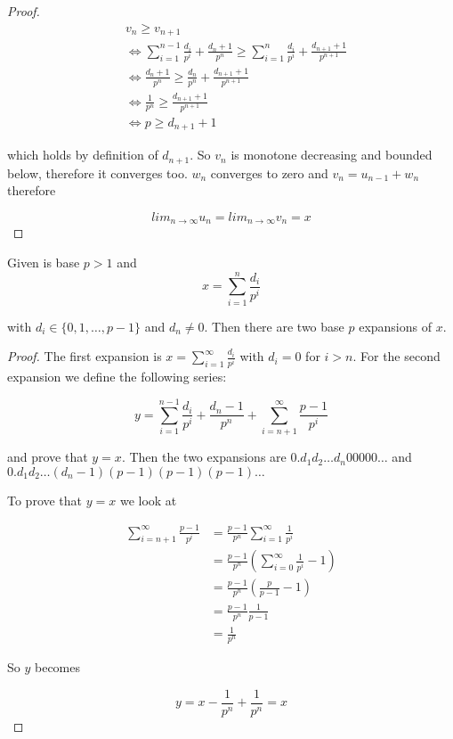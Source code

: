 \begin{proof}
\begin{align*}
& v_n \geq v_{n+1} \\
&\Leftrightarrow \sum_{i = 1}^{n-1} \frac{d_i}{p^i} + \frac{d_n + 1}{p^n} \geq \sum_{i = 1}^n \frac{d_i}{p^i} + \frac{d_{n+1} + 1}{p^{n+1}} \\
&\Leftrightarrow \frac{d_n + 1}{p^n} \geq \frac{d_n}{p^n} + \frac{d_{n+1} + 1}{p^{n+1}} \\
&\Leftrightarrow \frac{1}{p^n} \geq \frac{d_{n+1} + 1}{p^{n+1}} \\
&\Leftrightarrow p \geq d_{n+1} + 1
\end{align*}

which holds by definition of $d_{n+1}$. So $v_n$ is monotone decreasing and bounded below, therefore it converges too. $w_n$ converges to zero and $v_n = u_{n-1} + w_n$ therefore 

$$
lim_{n \to \infty} u_n = lim_{n \to \infty} v_n = x
$$

\end{proof}

\begin{thm}\label{while_a_decimal_expansion_three}
Given is base $p > 1$ and
$$
x = \sum_{i=1}^n \frac{d_i}{p^i}
$$

with $d_i \in \{0, 1, \ldots, p-1\}$ and $d_n \neq 0$. Then there are two base $p$ expansions of $x$.
\end{thm}

\begin{proof}

The first expansion is $x = \sum_{i=1}^\infty \frac{d_i}{p^i}$ with $d_i = 0$ for $i > n$. For the second expansion we define the following series:

$$
y = \sum_{i=1}^{n-1} \frac{d_i}{p^i} + \frac{d_n - 1}{p^n} + \sum_{i=n+1}^\infty \frac{p-1}{p^i}
$$

and prove that $y = x$. Then the two expansions are $0.d_1d_2 \ldots d_n00000 \ldots$ and $0.d_1d_2 \ldots (d_n-1)(p-1)(p-1)(p-1) \ldots$

To prove that $y = x$ we look at

\begin{align*}
\sum_{i=n+1}^\infty \frac{p-1}{p^i} &= \frac{p-1}{p^n} \sum_{i=1}^\infty \frac{1}{p^i} \\
                                    &= \frac{p-1}{p^n} (\sum_{i=0}^\infty \frac{1}{p^i} - 1) \\
                                    &= \frac{p-1}{p^n} (\frac{p}{p-1} - 1) \\
                                    &= \frac{p-1}{p^n} \frac{1}{p-1} \\
                                    &= \frac{1}{p^n}
\end{align*}

So $y$ becomes

$$
y = x - \frac{1}{p^n} + \frac{1}{p^n} = x
$$
\end{proof}

